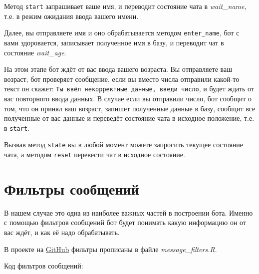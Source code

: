 \documentclass[
]{book}
\newenvironment{Shaded}{\begin{snugshade}}{\end{snugshade}}
\newcommand{\CommentTok}[1]{\textcolor[rgb]{0.56,0.35,0.01}{\textit{#1}}}
\newcommand{\ControlFlowTok}[1]{\textcolor[rgb]{0.13,0.29,0.53}{\textbf{#1}}}
\newcommand{\FunctionTok}[1]{\textcolor[rgb]{0.00,0.00,0.00}{#1}}
\newcommand{\NormalTok}[1]{#1}
\newcommand{\OtherTok}[1]{\textcolor[rgb]{0.56,0.35,0.01}{#1}}
\newcommand{\SpecialCharTok}[1]{\textcolor[rgb]{0.00,0.00,0.00}{#1}}
\newcommand{\StringTok}[1]{\textcolor[rgb]{0.31,0.60,0.02}{#1}}
\begin{document}
Метод \texttt{start} запрашивает ваше имя, и переводит состояние чата в \emph{wait\_name}, т.е. в режим ожидания ввода вашего имени.

Далее, вы отправляете имя и оно обрабатывается методом \texttt{enter\_name}, бот с вами здоровается, записывает полученное имя в базу, и переводит чат в состояние \emph{wait\_age}.

На этом этапе бот ждёт от вас ввода вашего возраста. Вы отправляете ваш возраст, бот проверяет сообщение, если вы вместо числа отправили какой-то текст он скажет: \texttt{Ты\ ввёл\ некорректные\ данные,\ введи\ число}, и будет ждать от вас повторного ввода данных. В случае если вы отправили число, бот сообщит о том, что он принял ваш возраст, запишет полученные данные в базу, сообщит все полученные от вас данные и переведёт состояние чата в исходное положение, т.е. в \texttt{start}.

Вызвав метод \texttt{state} вы в любой момент можете запросить текущее состояние чата, а методом \texttt{reset} перевести чат в исходное состояние.

\hypertarget{ux444ux438ux43bux44cux442ux440ux44b-ux441ux43eux43eux431ux449ux435ux43dux438ux439}{%
\section{Фильтры сообщений}\label{ux444ux438ux43bux44cux442ux440ux44b-ux441ux43eux43eux431ux449ux435ux43dux438ux439}}

В нашем случае это одна из наиболее важных частей в построении бота. Именно с помощью фильтров сообщений бот будет понимать какую информацию он от вас ждёт, и как её надо обрабатывать.

В проекте на \href{https://github.com/selesnow/logical_tg_bot}{GitHub} фильтры прописаны в файле \emph{message\_filters.R}.

Код фильтров сообщений:

\begin{Shaded}
\end{Shaded}
\end{document}
